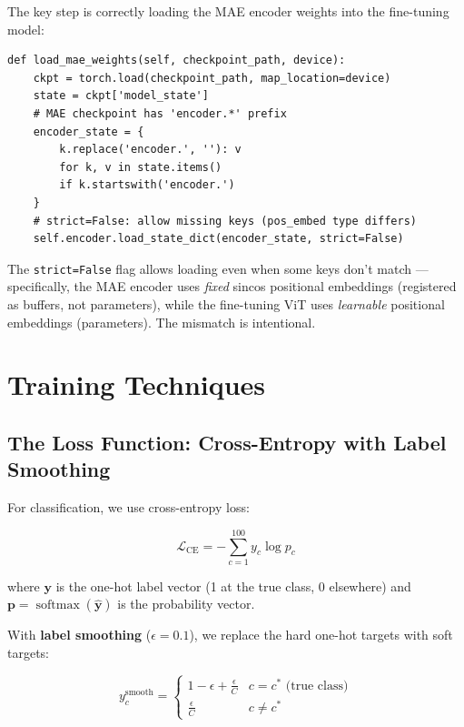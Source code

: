 \documentclass[12pt, a4paper]{report}
\newcommand{\softmax}{\operatorname{softmax}}
\newcommand{\vect}[1]{\bm{#1}}
\begin{document}
The key step is correctly loading the MAE encoder weights into the fine-tuning model:

\begin{lstlisting}[caption=Loading MAE weights for fine-tuning]
def load_mae_weights(self, checkpoint_path, device):
    ckpt = torch.load(checkpoint_path, map_location=device)
    state = ckpt['model_state']
    # MAE checkpoint has 'encoder.*' prefix
    encoder_state = {
        k.replace('encoder.', ''): v
        for k, v in state.items()
        if k.startswith('encoder.')
    }
    # strict=False: allow missing keys (pos_embed type differs)
    self.encoder.load_state_dict(encoder_state, strict=False)
\end{lstlisting}

The \texttt{strict=False} flag allows loading even when some keys don't match — specifically, the MAE encoder uses \emph{fixed} sincos positional embeddings (registered as buffers, not parameters), while the fine-tuning ViT uses \emph{learnable} positional embeddings (parameters). The mismatch is intentional.

\chapter{Training Techniques}

\section{The Loss Function: Cross-Entropy with Label Smoothing}

For classification, we use cross-entropy loss:

\begin{equation}
\mathcal{L}_{\text{CE}} = -\sum_{c=1}^{100} y_c \log p_c
\end{equation}

where $\vect{y}$ is the one-hot label vector (1 at the true class, 0 elsewhere) and $\vect{p} = \softmax(\hat{\vect{y}})$ is the probability vector.

With \textbf{label smoothing} ($\epsilon = 0.1$), we replace the hard one-hot targets with soft targets:

\begin{equation}
y_c^{\text{smooth}} = \begin{cases} 1 - \epsilon + \frac{\epsilon}{C} & c = c^* \text{ (true class)} \\ \frac{\epsilon}{C} & c \neq c^* \end{cases}
\end{equation}
\end{document}
